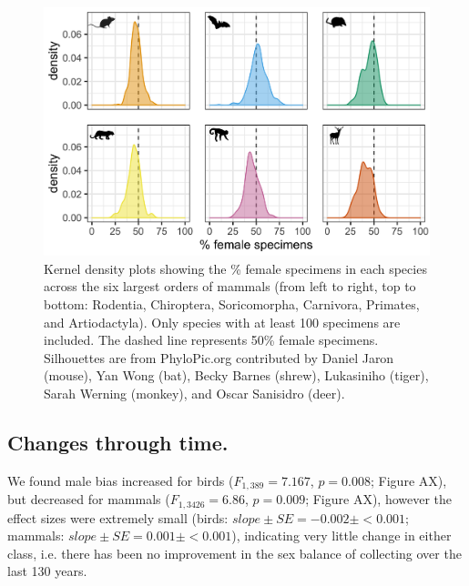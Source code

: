\documentclass[a4paper, 12pt]{article}
\begin{document}
\begin{figure}
 \centering
  \includegraphics[width = \linewidth]{figures/orders-density-mammals-six.png}
  \caption{Kernel density plots showing the \% female specimens in each species across the six largest orders of mammals (from left to right, top to bottom: Rodentia, Chiroptera, Soricomorpha, Carnivora, Primates, and Artiodactyla). 
  Only species with at least 100 specimens are included. 
  The dashed line represents 50\% female specimens. 
  Silhouettes are from PhyloPic.org contributed by Daniel Jaron (mouse), Yan Wong (bat), Becky Barnes (shrew), Lukasiniho (tiger), Sarah Werning (monkey), and Oscar Sanisidro (deer).
}
  \label{fig-mammal_order_six}
\end{figure}

\subsection{Changes through time.}
We found male bias increased for birds ($F_{1, 389} = 7.167$, $p = 0.008$; Figure AX), but decreased for mammals ($F_{1, 3426} = 6.86$, $p = 0.009$; Figure AX), however the effect sizes were extremely small (birds: $slope \pm SE = -0.002 \pm < 0.001$; mammals: $slope \pm SE = 0.001 \pm < 0.001$), indicating very little change in either class, i.e. there has been no improvement in the sex balance of collecting over the last 130 years.
\end{document}
